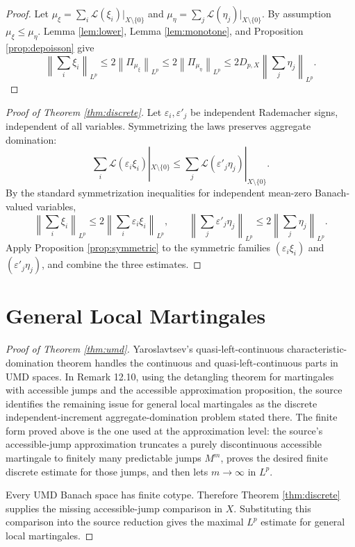 \documentclass[11pt]{article}
\newcommand{\norm}[1]{\left\lVert #1\right\rVert}
\newcommand{\eps}{\varepsilon}
\newcommand{\1}{\mathbf 1}
\begin{document}
\begin{proof}
Let \(\mu_\xi=\sum_i\mathcal L(\xi_i)|_{X\setminus\{0\}}\) and
\(\mu_\eta=\sum_j\mathcal L(\eta_j)|_{X\setminus\{0\}}\).  By assumption
\(\mu_\xi\le\mu_\eta\).  Lemma \ref{lem:lower}, Lemma \ref{lem:monotone},
and Proposition \ref{prop:depoisson} give
\[
  \norm{\sum_i\xi_i}_{L^p}
  \le
  2\norm{\Pi_{\mu_\xi}}_{L^p}
  \le
  2\norm{\Pi_{\mu_\eta}}_{L^p}
  \le
  2D_{p,X}\norm{\sum_j\eta_j}_{L^p}.
\]
\end{proof}

\begin{proof}[Proof of Theorem \ref{thm:discrete}]
Let \(\eps_i,\eps'_j\) be independent Rademacher signs, independent of all
variables.  Symmetrizing the laws preserves aggregate domination:
\[
  \sum_i\mathcal L(\eps_i\xi_i)|_{X\setminus\{0\}}
  \le
  \sum_j\mathcal L(\eps'_j\eta_j)|_{X\setminus\{0\}}.
\]
By the standard symmetrization inequalities for independent mean-zero
Banach-valued variables,
\[
  \norm{\sum_i\xi_i}_{L^p}
  \le
  2\norm{\sum_i\eps_i\xi_i}_{L^p},
  \qquad
  \norm{\sum_j\eps'_j\eta_j}_{L^p}
  \le
  2\norm{\sum_j\eta_j}_{L^p}.
\]
Apply Proposition \ref{prop:symmetric} to the symmetric families
\((\eps_i\xi_i)\) and \((\eps'_j\eta_j)\), and combine the three estimates.
\end{proof}

\section*{General Local Martingales}

\begin{proof}[Proof of Theorem \ref{thm:umd}]
Yaroslavtsev's quasi-left-continuous characteristic-domination theorem
\cite[Theorem 12.6]{Yaroslavtsev2019} handles the continuous and
quasi-left-continuous parts in UMD spaces.  In Remark 12.10, using the
detangling theorem for martingales with accessible jumps and the accessible
approximation proposition, the source identifies the remaining issue for
general local martingales as the discrete independent-increment
aggregate-domination problem stated there.  The finite form proved above is
the one used at the approximation level: the source's accessible-jump
approximation truncates a purely discontinuous accessible martingale to
finitely many predictable jumps \(M^m\), proves the desired finite discrete
estimate for those jumps, and then lets \(m\to\infty\) in \(L^p\).

Every UMD Banach space has finite cotype.  Therefore Theorem
\ref{thm:discrete} supplies the missing accessible-jump comparison in \(X\).
Substituting this comparison into the source reduction gives the maximal
\(L^p\) estimate for general local martingales.
\end{proof}
\end{document}
